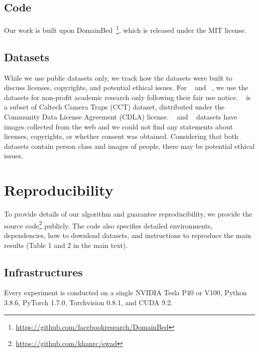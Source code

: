 \subsection{Code}

Our work is built upon DomainBed~\cite{gulrajani2020domainbed}\footnote{\url{https://github.com/facebookresearch/DomainBed}}, which is released under the MIT license.

\subsection{Datasets}

While we use public datasets only, we track how the datasets were built to discuss licenses, copyrights, and potential ethical issues.
For ~\cite{peng2019domainnet} and ~\cite{venkateswara2017officehome}, we use the datasets for non-profit academic research only following their fair use notice. ~\cite{beery2018terraincognita} is a subset of Caltech Camera Traps (CCT) dataset, distributed under the Community Data License Agreement (CDLA) license.
~\cite{li2017pacs} and ~\cite{fang2013vlcs} datasets have images collected from the web and we could not find any statements about licenses, copyrights, or whether consent was obtained.
Considering that both datasets contain person class and images of people, there may be potential ethical issues.


\section{Reproducibility}

To provide details of our algorithm and guarantee reproducibility, we provide the source code\footnote{\url{https://github.com/khanrc/swad}} publicly. The code also specifies detailed environments, dependencies, how to download datasets, and instructions to reproduce the main results (Table 1 and 2 in the main text).

\subsection{Infrastructures}

Every experiment is conducted on a single NVIDIA Tesla P40 or V100, Python 3.8.6, PyTorch 1.7.0, Torchvision 0.8.1, and CUDA 9.2.

